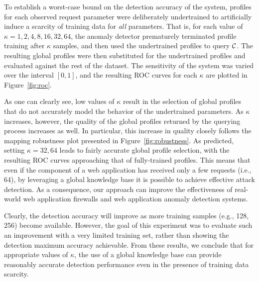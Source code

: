 To establish a worst-case bound on the detection accuracy of the
system, profiles for each observed request parameter were deliberately
undertrained to artificially induce a scarcity of training data for
\emph{all} parameters.  That is, for each value of
$\kappa=1,2,4,8,16,32,64$, the anomaly detector prematurely terminated
profile training after $\kappa$ samples, and then used the
undertrained profiles to query $\mathcal{C}$.  The resulting global profiles
were then substituted for the undertrained profiles and evaluated
against the rest of the dataset.  The sensitivity of the system was
varied over the interval $\left[0,1\right]$, and the resulting
\ac{ROC} curves for each $\kappa$ are plotted in
Figure~\ref{fig:roc}.

As one can clearly see, low values of $\kappa$ result in the selection
of global profiles that do not accurately model the behavior of the
undertrained parameters. As $\kappa$ increases, however, the quality
of the global profiles returned by the querying process increases as
well.  In particular, this increase in quality closely follows the
mapping robustness plot presented in Figure~\ref{fig:robustness}.  As
predicted, setting $\kappa=32,64$ leads to fairly accurate global
profile selection, with the resulting \ac{ROC} curves
approaching that of fully-trained profiles.  This means that even if
the component of a web application has received only a few requests
(i.e., 64), by leveraging a global knowledge base it is possible to
achieve effective attack detection.  As a consequence, our approach
can improve the effectiveness of real-world web application firewalls
and web application anomaly detection systems.

Clearly, the detection accuracy will improve as more training samples
(e.g., 128, 256) become available. However, the goal of this
experiment was to evaluate such an improvement with a very limited
training set, rather than showing the detection maximum accuracy
achievable. From these results, we conclude that for appropriate
values of $\kappa$, the use of a global knowledge base can provide
reasonably accurate detection performance even in the presence of
training data scarcity.

